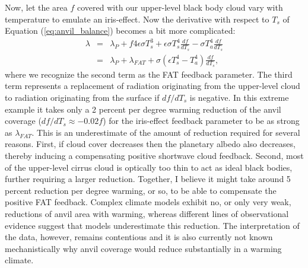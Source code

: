 \documentclass[12pt]{book}
\begin{document}
Now, let the area $f$ covered with our upper-level black body cloud vary with temperature to emulate an iris-effect. Now the derivative with respect to $T_s$ of Equation (\ref{eq:anvil_balance}) becomes a bit more complicated:
\begin{eqnarray}
\lambda &=&  \lambda_P + f 4 \epsilon \sigma T_s^3 + \epsilon \sigma T_s^4\frac{df}{dT_s} - \sigma T_a^4\frac{df}{dT_s} \nonumber \\
&=&  \lambda_P + \lambda_{FAT} +  \sigma \left( \epsilon T_s^4 - T_a^4\right)\frac{df}{dT_s},
\label{eq:lambda_iris}
\end{eqnarray}
where we recognize the second term as the FAT feedback parameter. The third term represents a replacement of radiation originating from the upper-level cloud to radiation originating from the surface if $df/dT_s$ is negative. In this extreme example it takes only a 2 percent per degree warming reduction of the anvil coverage ($df/dT_s \approx -0.02f$) for the iris-effect feedback parameter to be as strong as  $\lambda_{FAT}$. This is an underestimate of the amount of reduction required for several reasons. First, if cloud cover decreases then the planetary albedo also decreases, thereby inducing a compensating positive shortwave cloud feedback. Second, most of the upper-level cirrus cloud is optically too thin to act as ideal black bodies, further requiring a larger reduction. Together, I believe it might take around 5 percent reduction per degree warming, or so, to be able to compensate the positive FAT feedback.
Complex climate models exhibit no, or only very weak, reductions of anvil area with warming, whereas different lines of observational evidence suggest that models underestimate this reduction. The interpretation of the data, however, remains contentious and it is also currently not known mechanistically why anvil coverage would reduce substantially in a warming climate.

\end{document}
